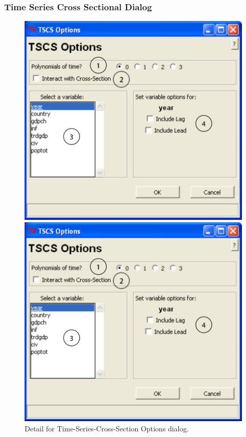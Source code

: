 \documentclass[12pt,titlepage]{article}
\begin{document}
\subsubsection{Time Series Cross Sectional Dialog}
\label{sec:tscsdiag}
\begin{figure}[ht]
  \centering 
  \begin{htmlonly} 
    \includegraphics[scale=1]{tscs} 
  \end{htmlonly}
  \begin{latexonly}
    \includegraphics[scale=.75]{tscs}
  \end{latexonly}
  \caption{Detail for Time-Series-Cross-Section Options dialog.}
\end{figure}
\end{document}
